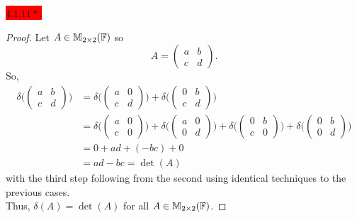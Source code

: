 \documentclass{exam}
\begin{document}
  \colorbox{red}{\underline{$4.1.11*$}:}
  \begin{solution}
    \begin{proof}
      Let $A \in \mathbb M_{2 \times 2}(\mathbb F)$ so 
      \[
        A = \begin{pmatrix}
          a & b \\ c & d
        \end{pmatrix}.
      \]
      So, 
      \begin{align*}
        \delta\Biggl(\begin{pmatrix}
          a & b \\
          c & d
        \end{pmatrix}\Biggr) &= \delta\Biggl(\begin{pmatrix}
          a & 0 \\
          c & d
        \end{pmatrix}\Biggr) + \delta\Biggl(\begin{pmatrix}
        0 & b \\
        c & d 
        \end{pmatrix}\Biggr) \\
        &= \delta\Biggl(\begin{pmatrix}
        a & 0 \\
        c & 0 
        \end{pmatrix}\Biggr) + \delta\Biggl(\begin{pmatrix}
        a & 0 \\
        0 & d 
        \end{pmatrix}\Biggr) + \delta\Biggl(\begin{pmatrix}
        0 & b \\
        c & 0 
        \end{pmatrix}\Biggr) + \delta\Biggl(\begin{pmatrix}
        0 & b \\
        0 & d 
        \end{pmatrix}\Biggr) \\
        &= 0 + ad + (-bc) + 0 \\
        &= ad - bc = \det(A)
      \end{align*}
      with the third step following from the second using identical techniques to the previous cases. \\
      Thus, $\delta(A) = \det(A)$ for all $A \in \mathbb M_{2 \times 2}(\mathbb F)$.
    \end{proof}
  \end{solution}
\end{document}
